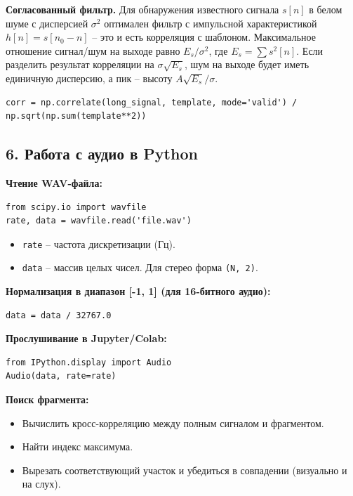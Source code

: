 \documentclass[12pt,a4paper,openany]{book}
\providecommand{\tightlist}{\setlength{\itemsep}{0pt}\setlength{\parskip}{0pt}}
\begin{document}
\textbf{Согласованный фильтр.} Для обнаружения известного сигнала \(s[n]\) в белом шуме с дисперсией \(\sigma^2\) оптимален фильтр с импульсной характеристикой \(h[n] = s[n_0 - n]\) -- это и есть корреляция с шаблоном. Максимальное отношение сигнал/шум на выходе равно \(E_s/\sigma^2\), где \(E_s = \sum s^2[n]\). Если разделить результат корреляции на \(\sigma\sqrt{E_s}\), шум на выходе будет иметь единичную дисперсию, а пик -- высоту \(A\sqrt{E_s}/\sigma\).

\begin{Verbatim}[fontsize=\small, breaklines, breakanywhere]
corr = np.correlate(long_signal, template, mode='valid') / np.sqrt(np.sum(template**2))
\end{Verbatim}

\subsection*{6. Работа с аудио в Python}

\textbf{Чтение WAV-файла:}

\begin{Verbatim}[fontsize=\small, breaklines, breakanywhere]
from scipy.io import wavfile
rate, data = wavfile.read('file.wav')
\end{Verbatim}

\begin{itemize}
\tightlist
\item
  \texttt{rate} -- частота дискретизации (Гц).
\item
  \texttt{data} -- массив целых чисел. Для стерео форма \texttt{(\allowbreak{}N,\allowbreak{}\ 2)}.
\end{itemize}

\textbf{Нормализация в диапазон {[}-1, 1{]} (для 16-битного аудио):}

\begin{Verbatim}[fontsize=\small, breaklines, breakanywhere]
data = data / 32767.0
\end{Verbatim}

\textbf{Прослушивание в Jupyter/Colab:}

\begin{Verbatim}[fontsize=\small, breaklines, breakanywhere]
from IPython.display import Audio
Audio(data, rate=rate)
\end{Verbatim}

\textbf{Поиск фрагмента:}

\begin{itemize}
\tightlist
\item
  Вычислить кросс-корреляцию между полным сигналом и фрагментом.
\item
  Найти индекс максимума.
\item
  Вырезать соответствующий участок и убедиться в совпадении (визуально и на слух).
\end{itemize}
\end{document}
